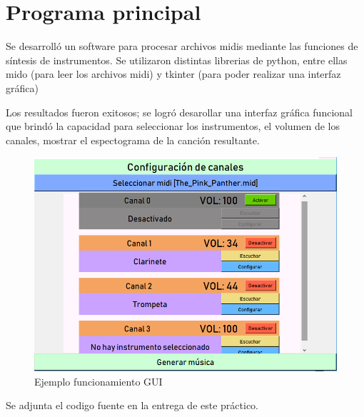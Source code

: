 \documentclass[assd_tp2_main.tex]{subfiles}
\begin{document}
\section{Programa principal}
Se desarrolló un software para procesar archivos midis mediante las funciones de síntesis de instrumentos. Se utilizaron distintas librerias de python, entre ellas mido (para leer los archivos midi) y tkinter (para poder realizar una interfaz gráfica)

Los resultados fueron exitosos; se logró desarollar una interfaz gráfica funcional que brindó la capacidad para seleccionar los instrumentos, el volumen de los canales, mostrar el espectograma de la canción resultante.


\begin{figure}[H]
\centering
\includegraphics[width=1\linewidth]{graficos/gui.png}
\caption{Ejemplo funcionamiento GUI}

\end{figure}

Se adjunta el codigo fuente en la entrega de este práctico.
\end{document}
